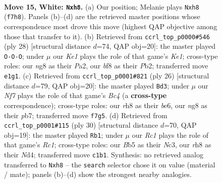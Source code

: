 \documentclass[11pt]{article}
\begin{document}
\clearpage

\begin{figure}[p]\centering
\begin{subfigure}{0.46\textwidth}\centering
\resizebox{\linewidth}{!}{%
\newchessgame
\chessboard[
  setfen={rnk2bnr/pp3N1p/4p3/1B1p1bp1/3p4/N7/P1P2PPP/2R1K2R w K - 2 15},
  showmover=false,
  pgfstyle=straightmove, color=movearrow, markmove={f7-h8}
]}
\caption{}
\end{subfigure}\hfill
\begin{subfigure}{0.46\textwidth}\centering
\resizebox{\linewidth}{!}{%
\newchessgame
\chessboard[
  setfen={2r4r/pp2kppp/2b1pn2/8/1bP4P/2N2P2/PPBB2P1/R3K2R w KQ - 1 15},
  showmover=false,
  pgfstyle=straightmove, color=movearrow, markmove={e1-c1}
]}
\caption{}
\end{subfigure}
\\[4pt]
\begin{subfigure}{0.46\textwidth}\centering
\resizebox{\linewidth}{!}{%
\newchessgame
\chessboard[
  setfen={r3kn1r/pp2p1bp/2p1b1p1/8/2B5/2N1B3/PPP2PPP/R3K2R w KQ - 5 14},
  showmover=false,
  pgfstyle=straightmove, color=movearrow, markmove={c4-d3}
]}
\caption{}
\end{subfigure}\hfill
\begin{subfigure}{0.46\textwidth}\centering
\resizebox{\linewidth}{!}{%
\newchessgame
\chessboard[
  setfen={rn3rk1/1p1bpp1p/5bp1/1B1P4/3N4/p1N1P3/P4PPP/2R1K2R w K - 1 16},
  showmover=false,
  pgfstyle=straightmove, color=movearrow, markmove={c1-b1}
]}
\caption{}
\end{subfigure}
\caption{\textbf{Move 15, White: \texttt{Nxh8}.} (a) Our position; Melanie plays \texttt{Nxh8} (\texttt{f7h8}). Panels (b)--(d) are the retrieved master positions whose correspondence most drove this move (highest QAP objective among those that transfer to it). (b) Retrieved from \texttt{ccrl\_top\_p0000\#546} (ply 28) [structural distance $d$=74, QAP obj=20]: the master played \texttt{O-O-O}; under $\mu$ our \emph{Ke1} plays the role of that game's \emph{Ke1}; cross-type roles: our \emph{n}g8 as their \emph{P}a2, our \emph{b}f8 as their \emph{P}b2; transferred move \texttt{e1g1}. (c) Retrieved from \texttt{ccrl\_top\_p0001\#821} (ply 26) [structural distance $d$=79, QAP obj=20]: the master played \texttt{Bd3}; under $\mu$ our \emph{Nf7} plays the role of that game's \emph{Bc4} (a \textbf{cross-type} correspondence); cross-type roles: our \emph{r}h8 as their \emph{b}e6, our \emph{n}g8 as their \emph{p}b7; transferred move \texttt{f7g5}. (d) Retrieved from \texttt{ccrl\_top\_p0001\#115} (ply 30) [structural distance $d$=70, QAP obj=19]: the master played \texttt{Rb1}; under $\mu$ our \emph{Rc1} plays the role of that game's \emph{Rc1}; cross-type roles: our \emph{B}b5 as their \emph{N}c3, our \emph{r}h8 as their \emph{N}d4; transferred move \texttt{c1b1}. Synthesis: no retrieved analog transferred to \texttt{Nxh8} -- the \texttt{search} selector chose it on value (material / mate); panels (b)--(d) show the strongest nearby analogies.}
\label{fig:thought-m28}
\end{figure}
\end{document}
